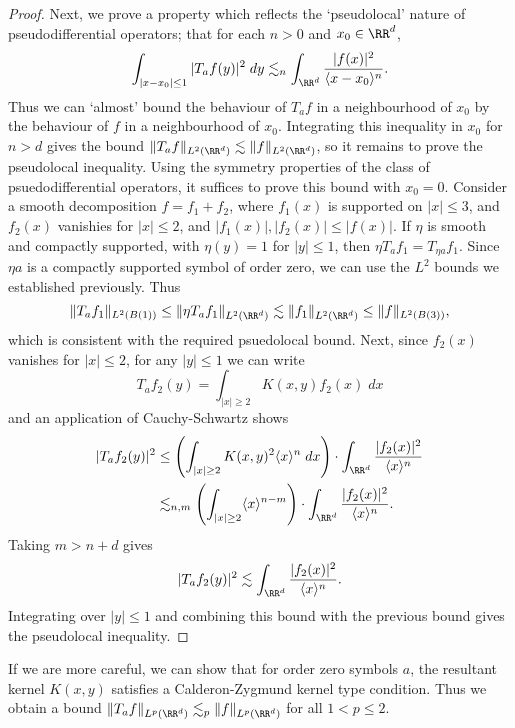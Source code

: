 \begin{proof}
    Next, we prove a property which reflects the `pseudolocal' nature of pseudodifferential operators; that for each $n > 0$ and $x_0 \in \RR^d$,
    \[ \int_{|x - x_0| \leq 1} |T_af(y)|^2\; dy \lesssim_n \int_{\RR^d} \frac{|f(x)|^2}{\langle x - x_0 \rangle^n}. \]
    Thus we can `almost' bound the behaviour of $T_af$ in a neighbourhood of $x_0$ by the behaviour of $f$ in a neighbourhood of $x_0$. Integrating this inequality in $x_0$ for $n > d$ gives the bound $\| T_af \|_{L^2(\RR^d)} \lesssim \| f \|_{L^2(\RR^d)}$, so it remains to prove the pseudolocal inequality. Using the symmetry properties of the class of psuedodifferential operators, it suffices to prove this bound with $x_0 = 0$. Consider a smooth decomposition $f = f_1 + f_2$, where $f_1(x)$ is supported on $|x| \leq 3$, and $f_2(x)$ vanishies for $|x| \leq 2$, and $|f_1(x)|, |f_2(x)| \leq |f(x)|$. If $\eta$ is smooth and compactly supported, with $\eta(y) = 1$ for $|y| \leq 1$, then $\eta T_a f_1 = T_{\eta a} f_1$. Since $\eta a$ is a compactly supported symbol of order zero, we can use the $L^2$ bounds we established previously. Thus
    \[ \| T_a f_1 \|_{L^2(B(1))} \leq \| \eta T_a f_1 \|_{L^2(\RR^d)} \lesssim \| f_1 \|_{L^2(\RR^d)} \leq \| f \|_{L^2(B(3))}, \]
    which is consistent with the required psuedolocal bound. Next, since $f_2(x)$ vanishes for $|x| \leq 2$, for any $|y| \leq 1$ we can write
    \[ T_a f_2(y) = \int_{|x| \geq 2} K(x,y) f_2(x)\; dx \]
    and an application of Cauchy-Schwartz shows
    \begin{align*}
        |T_a f_2(y)|^2 &\leq \left( \int_{|x| \geq 2} K(x,y)^2 \langle x \rangle^n\; dx \right) \cdot \int_{\RR^d} \frac{|f_2(x)|^2}{\langle x \rangle^n}\\
        &\lesssim_{n,m} \left( \int_{|x| \geq 2} \langle x \rangle^{n-m} \right) \cdot \int_{\RR^d} \frac{|f_2(x)|^2}{\langle x \rangle^n}.
    \end{align*}
    Taking $m > n + d$ gives
    \[ |T_a f_2(y)|^2 \lesssim \int_{\RR^d} \frac{|f_2(x)|^2}{\langle x \rangle^n}. \]
    Integrating over $|y| \leq 1$ and combining this bound with the previous bound gives the pseudolocal inequality.
\end{proof}

If we are more careful, we can show that for order zero symbols $a$, the resultant kernel $K(x,y)$ satisfies a Calderon-Zygmund kernel type condition. Thus we obtain a bound $\| T_a f \|_{L^p(\RR^d)} \lesssim_p \| f \|_{L^p(\RR^d)}$ for all $1 < p \leq 2$.

